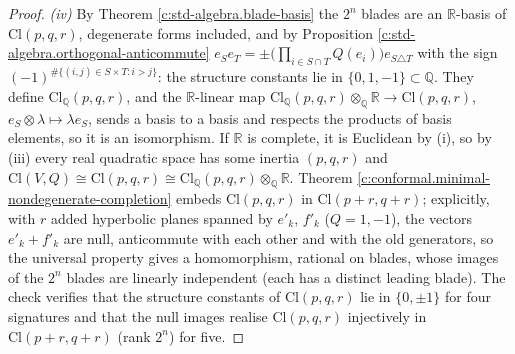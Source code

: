 \documentclass[11pt]{article}
\theoremstyle{definition}
\theoremstyle{plain}
\providecommand{\Cl}{}\renewcommand{\Cl}{\mathrm{Cl}}
\providecommand{\Q}{}\renewcommand{\Q}{\mathbb{Q}}
\providecommand{\R}{}\renewcommand{\R}{\mathbb{R}}
\begin{document}
\begin{proof}
\emph{(iv)} By Theorem \ref{c:std-algebra.blade-basis} the $2^{n}$ blades are an $\R$-basis of $\Cl(p,q,r)$, degenerate forms included, and by Proposition \ref{c:std-algebra.orthogonal-anticommute} $e_{S}e_{T} = \pm\bigl(\prod_{i \in S \cap T}Q(e_{i})\bigr)e_{S \triangle T}$ with the sign $(-1)^{\#\{(i,j) \in S \times T : i > j\}}$: the structure constants lie in $\{0, 1, -1\} \subset \Q$. They define $\Cl_{\Q}(p,q,r)$, and the $\R$-linear map $\Cl_{\Q}(p,q,r) \otimes_{\Q} \R \to \Cl(p,q,r)$, $e_{S} \otimes \lambda \mapsto \lambda e_{S}$, sends a basis to a basis and respects the products of basis elements, so it is an isomorphism. If $\R$ is complete, it is Euclidean by (i), so by (iii) every real quadratic space has some inertia $(p, q, r)$ and $\Cl(V, Q) \cong \Cl(p,q,r) \cong \Cl_{\Q}(p,q,r) \otimes_{\Q} \R$. Theorem \ref{c:conformal.minimal-nondegenerate-completion} embeds $\Cl(p,q,r)$ in $\Cl(p{+}r, q{+}r)$; explicitly, with $r$ added hyperbolic planes spanned by $e'_{k}$, $f'_{k}$ ($Q = 1, -1$), the vectors $e'_{k} + f'_{k}$ are null, anticommute with each other and with the old generators, so the universal property gives a homomorphism, rational on blades, whose images of the $2^{n}$ blades are linearly independent (each has a distinct leading blade). The check verifies that the structure constants of $\Cl(p,q,r)$ lie in $\{0, \pm 1\}$ for four signatures and that the null images realise $\Cl(p,q,r)$ injectively in $\Cl(p{+}r, q{+}r)$ (rank $2^{n}$) for five.


\end{proof}
\end{document}
